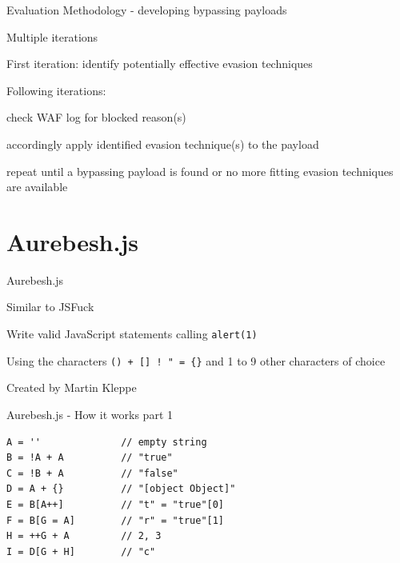 \documentclass[aspectratio=169]{beamer}
\begin{document}
\begin{frame}[fragile]{Evaluation Methodology - developing bypassing payloads}
	\begin{vfilleditems}
		\item<2-> Multiple iterations
		\item<3-> First iteration: identify potentially effective evasion techniques
		\item<4-> Following iterations:
		\begin{vfilleditems}
			\item<5-> check WAF log for blocked reason(s)
			\item<6-> accordingly apply identified evasion technique(s) to the payload
			\item<7-> repeat until a bypassing payload is found or no more fitting evasion techniques are available
		\end{vfilleditems}
	\end{vfilleditems}
\end{frame}



\section{Aurebesh.js}

\begin{frame}[fragile]{Aurebesh.js}
	\begin{vfilleditems}
		\item<2-> Similar to JSFuck \cite{mk/jsfuck}
		\item<3-> Write valid JavaScript statements calling \verb|alert(1)|
		\item<4-> Using the characters \verb|() + [] ! " = {}| and 1 to 9 other characters of choice
		\item<5-> Created by Martin Kleppe \cite{mk/aurebesh}
	\end{vfilleditems}
\end{frame}

\begin{frame}[fragile]{Aurebesh.js - How it works part 1}
	\begin{lstlisting}[style=basicStyle]
A = ''              // empty string
B = !A + A          // "true"
C = !B + A          // "false"
D = A + {}          // "[object Object]"
E = B[A++]          // "t" = "true"[0]
F = B[G = A]        // "r" = "true"[1]
H = ++G + A         // 2, 3
I = D[G + H]        // "c"
\end{lstlisting}
\end{frame}
\end{document}
